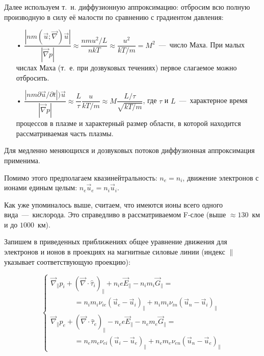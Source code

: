 \documentclass[14pt, a4paper, fleqn, twoside]{extreport}
\theoremstyle{definiton}
\theoremstyle{definition}
\begin{document}
\bigskip

Далее используем т.~н. диффузионную аппроксимацию: отбросим всю полную производную в силу её малости по сравнению с градиентом давления:

\begin{itemize}

\item[•] $\dfrac{|nm(\vec{u}; \vec{\nabla})\vec{u}|}{|\vec{\nabla}p|}\approx \dfrac{nmu^2/L}{nkT}\approx \dfrac{u^2}{kT/m}=M^2$~---~число Маха. При малых числах Маха (т.~е. при дозвуковых течениях) первое слагаемое можно отбросить.

\item[•] $\dfrac{|nm\partial\vec{u}/\partial t|)\vec{u}}{|\vec{\nabla}p|}\approx \dfrac{L}{\tau} \dfrac{u}{kT/m}\approx M\dfrac{L/\tau}{\sqrt{kT/m}}$, где $\tau$ и $L$~---~характерное время процессов в плазме и характерный размер области, в которой находится рассматриваемая часть плазмы.

\end{itemize}

Для медленно меняющихся и дозвуковых потоков диффузионная аппроксимация применима.

\bigskip

Помимо этого предполагаем квазинейтральность: $n_e=n_i$, движение электронов с ионами единым целым: $n_e \vec{u}_e=n_i \vec{u}_i$. 

Как уже упоминалось выше, считаем, что имеются ионы всего одного вида~---~кислорода. Это справедливо в рассматриваемом F-слое (выше $\approx 130$~км и до $1000$~км).

Запишем в приведенных приближениях общее уравнение движения для электронов и ионов в проекциях на магнитные силовые линии (индекс $\parallel$ указывает соответствующую проекцию):

$$\begin{cases}
\vec{\nabla}_\parallel p_i + (\vec{\nabla}\cdot \hat{\tau}_i)_\parallel + n_ie\vec{E}_\parallel-n_im_i\vec{G}_\parallel=\\
\textrm{ }\textrm{ }\textrm{ }\textrm{ }\textrm{ }=n_im_i\nu_{ie}(\vec{u}_e-\vec{u}_i)_\parallel+n_im_i\nu_{in}(\vec{u}_n-\vec{u}_i)_\parallel\\
\vec{\nabla}_\parallel p_e + (\vec{\nabla}\cdot \hat{\tau}_e)_\parallel - n_ee\vec{E}_\parallel-n_em_e\vec{G}_\parallel=\\
\textrm{ }\textrm{ }\textrm{ }\textrm{ }\textrm{ }=n_em_e\nu_{ei}(\vec{u}_i-\vec{u}_e)_\parallel+n_em_e\nu_{en}(\vec{u}_n-\vec{u}_e)_\parallel
\end{cases}$$
\end{document}
